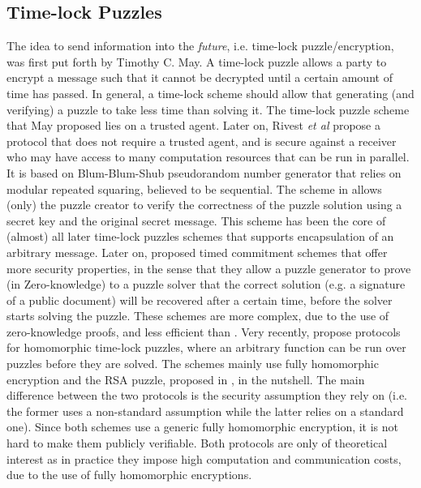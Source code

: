 
\subsection{Time-lock Puzzles}

The idea to send information into the \emph{future}, i.e.
time-lock puzzle/encryption, was first put forth by Timothy C. May. A time-lock puzzle allows a party to encrypt a message such that it cannot be decrypted  until a certain amount of time has passed. In general,  a  time-lock scheme should allow  that generating (and verifying) a puzzle to take less time than solving it. The time-lock puzzle scheme that May proposed lies on a trusted agent. Later on, Rivest \textit{et al} \cite{Rivest:1996:TPT:888615} propose a protocol that does not require a trusted agent, and is secure against a receiver
who may have access to many  computation resources that can be run in parallel. It is based on Blum-Blum-Shub pseudorandom number generator that relies on modular repeated squaring, believed to be sequential. The scheme in \cite{Rivest:1996:TPT:888615} allows (only) the puzzle creator to  verify the correctness of the puzzle solution using a secret key and the original secret message.  This scheme has been the core of (almost) all later time-lock puzzles schemes that supports encapsulation of an arbitrary message. Later on, \cite{BonehN00,DBLP:conf/fc/GarayJ02} proposed timed commitment schemes that offer more security properties, in the sense that they   allow a puzzle generator to prove (in Zero-knowledge) to a puzzle solver that the correct solution (e.g. a signature of a public document) will be recovered after a certain time, before the solver starts solving the puzzle. These schemes are more complex, due to the use of zero-knowledge proofs, and less efficient than \cite{Rivest:1996:TPT:888615}.    Very recently, \cite{MalavoltaT19,BrakerskiDGM19}  propose protocols for homomorphic time-lock puzzles, where an arbitrary function can be run over puzzles before they are solved. The schemes mainly use  fully homomorphic encryption and   the RSA puzzle, proposed in \cite{BrakerskiDGM19}, in the nutshell. The main difference between the two protocols is the security assumption they rely on (i.e. the former uses a non-standard assumption while the latter relies on a standard one). Since both schemes use a generic fully homomorphic encryption, it is not hard to make them publicly verifiable. Both protocols  are only of theoretical interest as in practice they impose  high computation and communication costs, due to the use of fully homomorphic encryptions.


